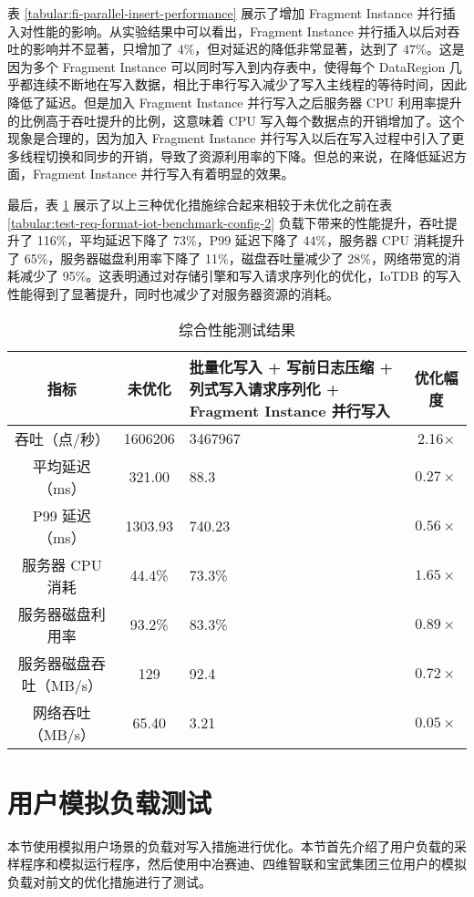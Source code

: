 表 \ref{tabular:fi-parallel-insert-performance} 展示了增加 Fragment Instance 并行插入对性能的影响。从实验结果中可以看出，Fragment Instance 并行插入以后对吞吐的影响并不显著，只增加了 $4\%$，但对延迟的降低非常显著，达到了 $47\%$。这是因为多个 Fragment Instance 可以同时写入到内存表中，使得每个 DataRegion 几乎都连续不断地在写入数据，相比于串行写入减少了写入主线程的等待时间，因此降低了延迟。但是加入 Fragment Instance 并行写入之后服务器 CPU 利用率提升的比例高于吞吐提升的比例，这意味着 CPU 写入每个数据点的开销增加了。这个现象是合理的，因为加入 Fragment Instance 并行写入以后在写入过程中引入了更多线程切换和同步的开销，导致了资源利用率的下降。但总的来说，在降低延迟方面，Fragment Instance 并行写入有着明显的效果。

最后，表 \ref{tabular:columnar-serialization-performance-vs-origin} 展示了以上三种优化措施综合起来相较于未优化之前在表 \ref{tabular:test-req-format-iot-benchmark-config-2} 负载下带来的性能提升，吞吐提升了 116\%，平均延迟下降了 73\%，P99 延迟下降了 44\%，服务器 CPU 消耗提升了 65\%，服务器磁盘利用率下降了 11\%，磁盘吞吐量减少了 28\%，网络带宽的消耗减少了 95\%。这表明通过对存储引擎和写入请求序列化的优化，IoTDB 的写入性能得到了显著提升，同时也减少了对服务器资源的消耗。

\begin{table}
  \centering
  \caption{综合性能测试结果}
  \begin{tabular}{ccp{5cm}c}
    \toprule 
    指标 &  未优化  & 批量化写入 + 写前日志压缩 + 列式写入请求序列化 + Fragment Instance 并行写入 & 优化幅度 \\
    \midrule
    吞吐（点/秒） & 1606206 & 	3467967 & 2.16$\times$\\
    平均延迟（ms） & 321.00 & 	88.3 & $0.27\times$\\
    P99 延迟（ms） & 1303.93 & 	740.23 & $0.56\times$ \\
    服务器 CPU 消耗 & 44.4\% & 	73.3\% & $1.65\times$\\
    服务器磁盘利用率 & 93.2\% & 	83.3\% & $0.89\times$\\
    服务器磁盘吞吐（MB/s） & 129 & 	92.4 & $0.72\times$ \\
    网络吞吐（MB/s） & 65.40 & 	3.21 & $0.05\times$\\
    \bottomrule 
  \end{tabular}
  \label{tabular:columnar-serialization-performance-vs-origin}
\end{table}

\section{用户模拟负载测试}
本节使用模拟用户场景的负载对写入措施进行优化。本节首先介绍了用户负载的采样程序和模拟运行程序，然后使用中冶赛迪、四维智联和宝武集团三位用户的模拟负载对前文的优化措施进行了测试。
